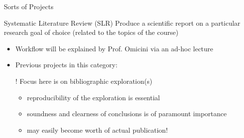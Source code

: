 \documentclass[presentation]{beamer}\mode<presentation>{\usetheme{AMSBolognaFC}}
\begin{document}
\begin{frame}[c, allowframebreaks]{Sorts of Projects}
    \begin{block}{Systematic Literature Review (SLR)}
        Produce a scientific report on a particular research goal of choice (related to the topics of the course)
        \begin{itemize}
            \item Workflow will be explained by Prof. Omicini via an ad-hoc lecture
            \item Previous projects in this category: 
            \item[!] Focus here is on bibliographic exploration(s)
            \begin{itemize}
                \item reproducibility of the exploration is essential
                \item soundness and clearness of conclusions is of paramount importance
                \item may easily become worth of actual publication!
            \end{itemize}
        \end{itemize}
    \end{block}
\end{frame}

\section*{}

\frame{\titlepage}

\section*{\refname}

\begin{frame}[c,noframenumbering]{\refname}
	\scriptsize
	
	
\end{frame}

\end{document}
